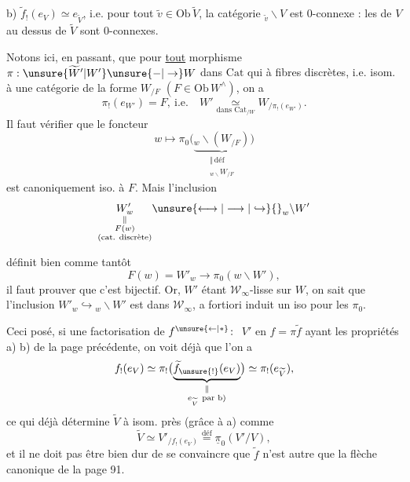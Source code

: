 b) $\widetilde f_!(e_V)\simeq e_{\widetilde V}$, i.e. pour tout $\widetilde v\in\mathrm{Ob}\,\widetilde V$,
la catégorie $ {}_{\widetilde v}\backslash V$ est $0$-connexe : les
  de $V$ au dessus
de $\widetilde V$ sont $0$-connexes.

Notons ici, en passant, que pour \uline{tout} morphisme
$\pi:\unsure{\widetilde W'|W'}\unsure{-|\to}W$ dans $\mathrm{Cat}$ qui   à fibres
discrètes, i.e.  isom.  à une
catégorie de la forme $W_{/F}$ $(F\in\mathrm{Ob}\,W^\wedge)$,
on a
\[
 \pi_!(e_{W'})=F,\ \text{i.e.}\quad W'\underset{\text{dans }\mathrm{Cat}_{/W}}{\simeq}W_{/\pi_!(e_{W'})}.\tag*{(*)}
\]
Il faut vérifier que le foncteur
\[
 w\mapsto\pi_0\bigl(\underbrace{{}_w\backslash(W_{/F})}_{\substack{\Vert\,\text{déf}\\ {}_{w\backslash}W_{/F}}}\bigr)
\]
est canoniquement iso. à $F$. Mais l'inclusion
\[
 \underset{\substack{\Vert\\ F(w)\\ \text{(cat. discrète)}}}{W'_w}\unsure{\longleftrightarrow|\longrightarrow|\hookrightarrow}{}_{w}\backslash W'
\]


définit bien comme tantôt
\[
 F(w)=W'_w\longrightarrow\pi_0(w\backslash W'),
\]
il faut prouver que c'est bijectif. Or, $W'$ étant
 $\mathcal W_\infty$-lisse sur $W$, on sait que l'inclusion
$W'_w\hookrightarrow{}_{w}\backslash W'$ est dans $\mathcal W_\infty$, a fortiori
induit un iso pour les $\pi_0$.

Ceci posé, si  une factorisation de $f^{\unsure{\leftarrow|*}}\colon$ $V'$
en $f=\pi\widetilde f$ ayant les propriétés a) b) de
la page précédente, on voit déjà que l'on a
\[
 f_!(e_V)\simeq\pi_!\bigl(\underbrace{\widetilde f_{\unsure{!}}(e_V)}_{\substack{\Vert\\e_{\widetilde V}\ \text{par b)}}}\bigr)\simeq\pi_!(e_{\widetilde V}),
\]
ce qui déjà détermine $\widetilde V$ à isom. 
près (grâce à a) comme
\[
 \widetilde V\simeq V'_{/f_!(e_V)}\overset{\text{déf}}{=}\underline{\pi}_0(V'/V),
\]
et il ne doit pas être bien dur de se
convaincre que $\widetilde f$ n'est autre que la 
flèche canonique de la page 91.

